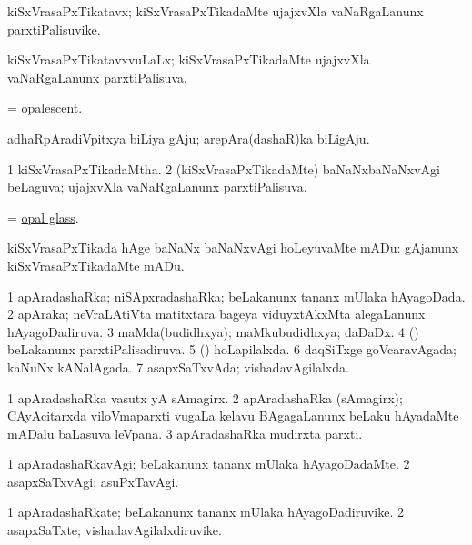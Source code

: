 \bentry
{}
\gl{\nA}
\bmng
kiSxVrasaPxTikatavx; kiSxVrasaPxTikadaMte ujajxvXla vaNaRgaLanunx parxtiPalisuvike. 
\emng
\eentry

\bentry
{}
\gl{\gu}
\bmng
kiSxVrasaPxTikatavxvuLaLx; kiSxVrasaPxTikadaMte ujajxvXla vaNaRgaLanunx parxtiPalisuva. 
\emng
\eentry

\bentry
{}
\gl{\gu}
\bmng
= \hyperlink{opalescent}{opalescent}. 
\emng
\eentry

\bentry
{}
\gl{\nA}
\bmng
adhaRpAradiVpitxya biLiya gAju; arepAra(dashaR)ka biLigAju. 
\emng
\eentry

\bentry
{}
\gl{\gu}
\bmng
% 
\bnum
\num{1} kiSxVrasaPxTikadaMtha. 
\num{2} (kiSxVrasaPxTikadaMte) baNaNxbaNaNxvAgi beLaguva; ujajxvXla vaNaRgaLanunx parxtiPalisuva. 
\enum
\emng
\eentry

\bentry
{}
\gl{\nA}
\bmng
= \hyperlink{opal glass}{opal glass}. 
\emng
\eentry

\bentry
{}
\gl{\sakirx}
\bmng
kiSxVrasaPxTikada hAge baNaNx baNaNxvAgi hoLeyuvaMte mADu:  gAjanunx kiSxVrasaPxTikadaMte mADu. 
\emng
\eentry

\bentry
{}
\gl{\gu}
\bmng
\bnum
\num{1} apAradashaRka; niSApxradashaRka; beLakanunx tananx mUlaka hAyagoDada. 
\num{2} apAraka; neVraLAtiVta matitxtara bageya viduyxtAkxMta alegaLanunx hAyagoDadiruva. 
\num{3} maMda(budidhxya); maMkubudidhxya; daDaDx. 
\num{4} (\viparx) beLakanunx parxtiPalisadiruva. 
\num{5} (\viparx) hoLapilalxda. 
\num{6} daqSiTxge goVcaravAgada; kaNuNx kANalAgada. 
\num{7} asapxSaTxvAda; vishadavAgilalxda. 
\enum
\emng
\eentry

\bentry
{}
\gl{\nA}
\bmng
\bnum
\num{1} apAradashaRka vasutx yA sAmagirx. 
\num{2} apAradashaRka (sAmagirx); CAyAcitarxda viloVmaparxti \mo vugaLa kelavu BAgagaLanunx beLaku hAyadaMte mADalu baLasuva leVpana. 
\num{3} apAradashaRka mudirxta parxti. 
\enum
\emng
\eentry

\bentry
{}
\gl{\kirxvi}
\bmng
\bnum
\num{1} apAradashaRkavAgi; beLakanunx tananx mUlaka hAyagoDadaMte. 
\num{2} asapxSaTxvAgi; asuPxTavAgi. 
\enum
\emng
\eentry

\bentry
{}
\gl{\nA}
\bmng
\bnum
\num{1} apAradashaRkate; beLakanunx tananx mUlaka hAyagoDadiruvike. 
\num{2} asapxSaTxte; vishadavAgilalxdiruvike. 
\enum
\emng
\eentry

